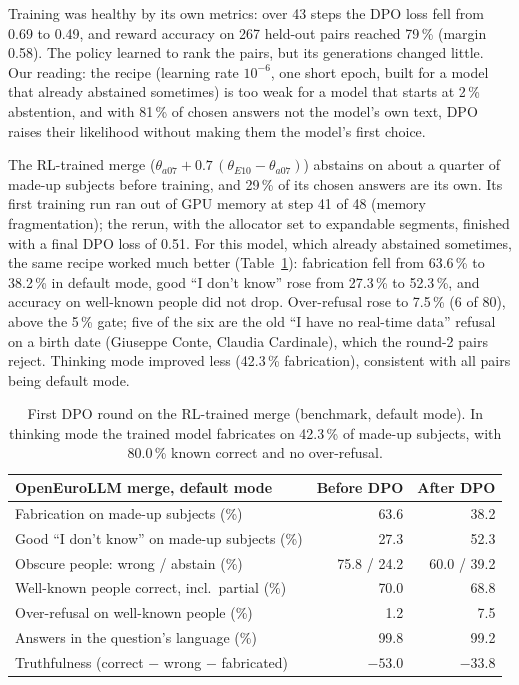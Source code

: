 \documentclass[11pt,a4paper]{article}
\begin{document}
Training was healthy by its own metrics: over 43 steps the DPO loss fell from 0.69 to 0.49, and reward accuracy on 267 held-out pairs reached 79\,\% (margin 0.58).
The policy learned to rank the pairs, but its generations changed little.
Our reading: the recipe (learning rate $10^{-6}$, one short epoch, built for a model that already abstained sometimes) is too weak for a model that starts at 2\,\% abstention, and with 81\,\% of chosen answers not the model's own text, DPO raises their likelihood without making them the model's first choice.

The RL-trained merge ($\theta_{a07} + 0.7\,(\theta_{E10} - \theta_{a07})$) abstains on about a quarter of made-up subjects before training, and 29\,\% of its chosen answers are its own.
Its first training run ran out of GPU memory at step 41 of 48 (memory fragmentation); the rerun, with the allocator set to expandable segments, finished with a final DPO loss of 0.51.
For this model, which already abstained sometimes, the same recipe worked much better (Table~\ref{tab:dpo1merge}): fabrication fell from 63.6\,\% to 38.2\,\% in default mode, good ``I don't know'' rose from 27.3\,\% to 52.3\,\%, and accuracy on well-known people did not drop.
Over-refusal rose to 7.5\,\% (6 of 80), above the 5\,\% gate; five of the six are the old ``I have no real-time data'' refusal on a birth date (Giuseppe Conte, Claudia Cardinale), which the round-2 pairs reject.
Thinking mode improved less (42.3\,\% fabrication), consistent with all pairs being default mode.

\begin{table}[t]
\centering
\small
\begin{tabular}{@{}lrr@{}}
\toprule
OpenEuroLLM merge, default mode & Before DPO & After DPO \\
\midrule
Fabrication on made-up subjects (\%) & 63.6 & 38.2 \\
Good ``I don't know'' on made-up subjects (\%) & 27.3 & 52.3 \\
Obscure people: wrong / abstain (\%) & 75.8 / 24.2 & 60.0 / 39.2 \\
Well-known people correct, incl.\ partial (\%) & 70.0 & 68.8 \\
Over-refusal on well-known people (\%) & 1.2 & 7.5 \\
Answers in the question's language (\%) & 99.8 & 99.2 \\
Truthfulness (correct $-$ wrong $-$ fabricated) & $-53.0$ & $-33.8$ \\
\bottomrule
\end{tabular}
\caption{First DPO round on the RL-trained merge (benchmark, default mode). In thinking mode the trained model fabricates on 42.3\,\% of made-up subjects, with 80.0\,\% known correct and no over-refusal.}
\label{tab:dpo1merge}
\end{table}
\end{document}
